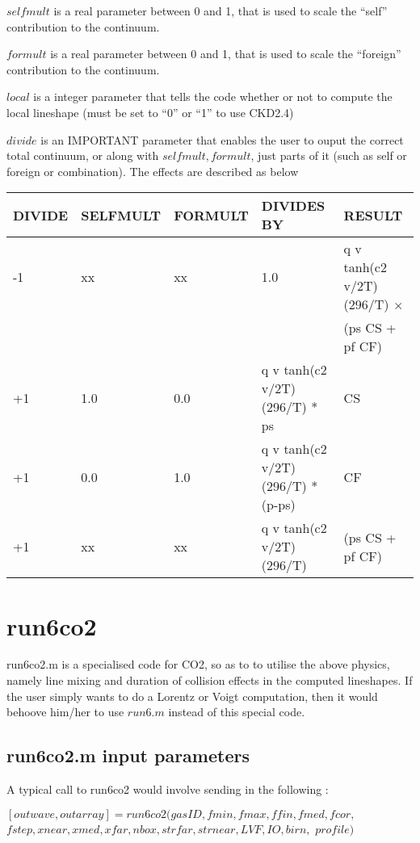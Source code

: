\documentclass[11pt]{article}
\begin{document}
$selfmult$ is a real parameter between 0 and 1, that is used to scale the
``self'' contribution to the continuum.

$formult$ is a real parameter between 0 and 1, that is used to scale the
``foreign'' contribution to the continuum.

$local$ is a integer parameter that tells the code whether or not to compute
the local lineshape (must be set to ``0'' or ``1'' to use CKD2.4)

$divide$ is an IMPORTANT parameter that enables the user to ouput the correct
total continuum, or along with $selfmult, formult$, just parts of it (such as 
self or foreign or combination). The effects are described as below
\begin{longtable}{lllll}
\hline
\hline
  DIVIDE  &   SELFMULT & FORMULT &  DIVIDES BY & RESULT \\
\hline
\hline
 -1 & xx  & xx  &  1.0 & q v tanh(c2 v/2T) (296/T) $\times$ \\
    &     &     &      & (ps CS + pf CF) \\
 +1 & 1.0 & 0.0 &  q v tanh(c2 v/2T) (296/T) * ps     & CS  \\
 +1 & 0.0 & 1.0 &  q v tanh(c2 v/2T) (296/T) * (p-ps) & CF  \\
 +1 & xx  & xx  &  q v tanh(c2 v/2T) (296/T)          & (ps CS + pf CF) \\
\hline
\hline
\end{longtable}

\section{run6co2}

run6co2.m is a specialised code for CO2, so as to to utilise the above 
physics, namely line mixing and duration of collision effects in the 
computed lineshapes. If the user simply wants to do a Lorentz or Voigt 
computation, then it would behoove him/her to use $run6.m$ instead of this 
special code.

\subsection{run6co2.m input parameters}

A typical call to run6co2 would involve sending in the following : 

$[outwave,outarray]=run6co2(gasID,fmin,fmax,ffin,fmed,fcor,$\\
              $fstep,xnear,xmed,xfar,nbox,strfar,strnear,LVF,IO,birn,$
              $profile)$
\end{document}
